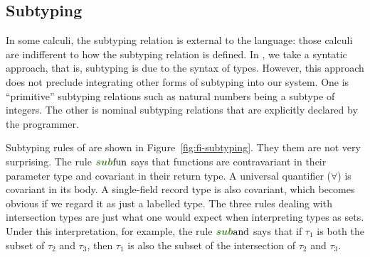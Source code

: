 \subsection{Subtyping}






In some calculi, the subtyping relation is external to the language: those
calculi are indifferent to how the subtyping relation is defined. In \name, we
take a syntatic approach, that is, subtyping is due to the syntax of types.
However, this approach does not preclude integrating other forms of subtyping
into our system. One is ``primitive'' subtyping relations such as natural
numbers being a subtype of integers. The other is nominal subtyping relations
that are explicitly declared by the programmer.

\begin{figure*}[h]
  
  \caption{Subtyping in \name.}
  \label{fig:fi-subtyping}
\end{figure*}

Subtyping rules of \name are shown in Figure~\ref{fig:fi-subtyping}. They them
are not very surprising. The rule $\rulelabelsubfun$ says that functions are
contravariant in their parameter type and covariant in their return type. A
universal quantifier ($\forall$) is covariant in its body. A single-field record
type is also covariant, which becomes obvious if we regard it as just a labelled
type. The three rules dealing with intersection types are just what one would
expect when interpreting types as sets. Under this interpretation, for example,
the rule $\rulelabelsuband$ says that if $\tau_1$ is both the subset of $\tau_2$
and $\tau_3$, then $\tau_1$ is also the subset of the intersection of $\tau_2$
and $\tau_3$.

